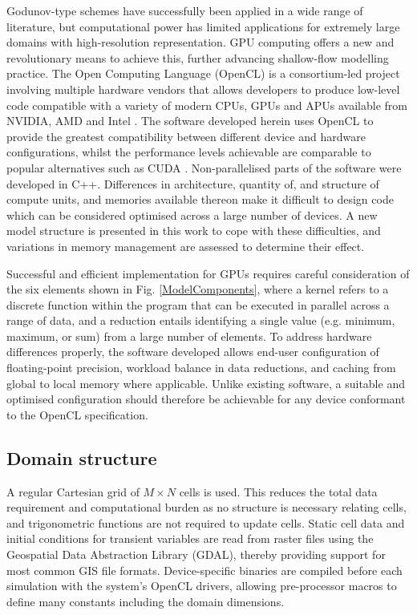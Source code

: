 \documentclass[11pt,english,a4paper]{article}
\begin{document}
Godunov-type schemes have successfully been applied in a wide range of literature, but computational power has limited applications for extremely large domains with high-resolution representation. GPU computing offers a new and revolutionary means to achieve this, further advancing shallow-flow modelling practice. The Open Computing Language (OpenCL) is a consortium-led project involving multiple hardware vendors that allows developers to produce low-level code compatible with a variety of modern CPUs, GPUs and APUs available from NVIDIA, AMD and Intel \cite{KhronosOpenCL_12,NVIDIA_10,AMD_11}. The software developed herein uses OpenCL to provide the greatest compatibility between different device and hardware configurations, whilst the performance levels achievable are comparable to popular alternatives such as CUDA \cite{Fang_11}. Non-parallelised parts of the software were developed in C++. Differences in architecture, quantity of, and structure of compute units, and memories available thereon make it difficult to design code which can be considered optimised across a large number of devices. A new model structure is presented in this work to cope with these difficulties, and variations in memory management are assessed to determine their effect.

Successful and efficient implementation for GPUs requires careful consideration of the six elements shown in Fig. \ref{ModelComponents}, where a kernel refers to a discrete function within the program that can be executed in parallel across a range of data, and a reduction entails identifying a single value (e.g. minimum, maximum, or sum) from a large number of elements. To address hardware differences properly, the software developed allows end-user configuration of floating-point precision, workload balance in data reductions, and caching from global to local memory where applicable. Unlike existing software, a suitable and optimised configuration should therefore be achievable for any device conformant to the OpenCL specification.

\subsection{Domain structure}

A regular Cartesian grid of \(M \times N\) cells is used. This reduces the total data requirement and computational burden as no structure is necessary relating cells, and trigonometric functions are not required to update cells. Static cell data and initial conditions for transient variables are read from raster files using the Geospatial Data Abstraction Library (GDAL), thereby providing support for most common GIS file formats. Device-specific binaries are compiled before each simulation with the system's OpenCL drivers, allowing pre-processor macros to define many constants including the domain dimensions. 
\end{document}
